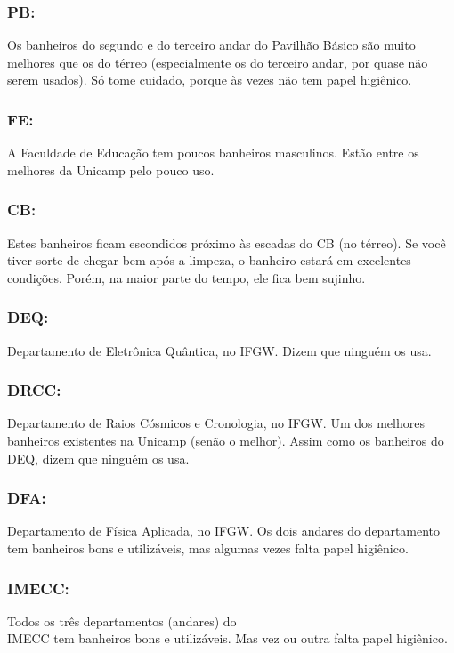 \subsubsection{PB:} Os banheiros do segundo e do terceiro andar do Pavilhão
Básico são muito melhores que os do térreo (especialmente os do terceiro andar,
por quase não serem usados). Só tome cuidado, porque às vezes não tem papel
higiênico.

\subsubsection{FE:} A Faculdade de Educação tem poucos banheiros masculinos.
Estão entre os melhores da Unicamp pelo pouco uso.

\subsubsection{CB:} Estes banheiros ficam escondidos próximo às escadas do CB
(no térreo). Se você tiver sorte de chegar bem após a limpeza, o banheiro
estará em excelentes condições. Porém, na maior parte do tempo, ele fica bem
sujinho.

\subsubsection{DEQ:} Departamento de Eletrônica Quântica, no IFGW. Dizem que
ninguém os usa.

\subsubsection{DRCC:} Departamento de Raios Cósmicos e Cronologia, no IFGW. Um
dos melhores banheiros existentes na Unicamp (senão o melhor). Assim como os
banheiros do DEQ, dizem que ninguém os usa.

\subsubsection{DFA:} Departamento de Física Aplicada, no IFGW. Os dois andares
do departamento tem banheiros bons e utilizáveis, mas algumas vezes falta
papel higiênico.

\subsubsection{IMECC:} Todos os três departamentos (andares) do\\IMECC tem
banheiros bons e utilizáveis. Mas vez ou outra falta papel higiênico.
